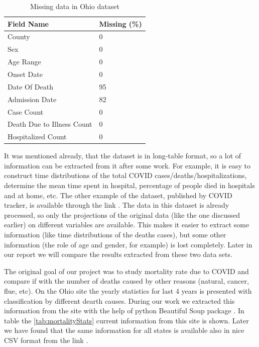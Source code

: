 \documentclass[conference]{IEEEtran}
\begin{document}
\begin{table}
  \centering
  \begin{tabular}{ll}
    \toprule
    Field Name & Missing (\%) \\
    \midrule
    County & 0  \\
    Sex & 0  \\
    Age Range & 0  \\
               Onset Date & 0  \\
               Date Of Death & 95 \\
               Admission Date &  82 \\
               Case Count & 0  \\
               Death Due to Illness Count & 0 \\
               Hospitalized Count & 0  \\
    \bottomrule
  \end{tabular}
  \caption{Missing data in Ohio dataset}
  \label{tab:Ohio:missing}
\end{table}

It was mentioned already, that the dataset is in long-table format, so a lot of information can be extracted from it after some work. For example, it is easy to construct time distributions of the total COVID cases/deaths/hospitalizations, determine the mean time spent in hospital, percentage of people died in hospitals and at home, etc. The other example of the dataset, published by COVID tracker, is available through the link \cite{covid19tracking_covid_nodate}. The data in this dataset is already processed, so only the projections of the original data (like the one discussed earlier) on different variables are available. This makes it easier to extract some information (like time distributions of the deaths cases), but some other information (the role of age and gender, for example) is lost completely. Later in our report we will compare the results extracted from these two data sets.

The original goal of our project was to study mortality rate due to COVID and compare if with the number of deaths caused by other reasons (natural, cancer, flue, etc). On the Ohio site \cite{statistics_stats_nodate} the yearly statistics for last 4 years is presented with classification by different dearth causes. During our work we extracted this information from the site with the help of python Beautiful Soup package \cite{team_beautiful_nodate}. In table the \ref{tab:mortalityStats} current information from this site is shown. Later we have found that the same information for all states is available also in nice CSV format from the link \cite{cdc_weekly_nodate}. 
\end{document}
